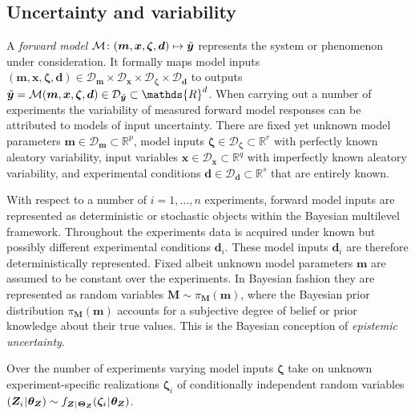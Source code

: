 \subsection{Uncertainty and variability} \label{sec:JAIS:Multilevel:Uncertainty}
A \textit{forward model} \(\mathcal{M} \colon (\bm{m},\bm{x},\bm{\zeta},\bm{d}) \mapsto \tilde{\bm{y}}\) represents the system or phenomenon under consideration.
It formally maps model inputs \((\bm{m},\bm{x},\bm{\zeta},\bm{d}) \in \mathcal{D}_{\bm{m}} \times \mathcal{D}_{\bm{x}} \times \mathcal{D}_{\bm{\zeta}} \times \mathcal{D}_{\bm{d}}\)
to outputs \(\perfect{\bm{y}}=\mathcal{M}(\bm{m},\bm{x},\bm{\zeta},\bm{d}) \in \mathcal{D}_{\perfect{\bm{y}}} \subset \mathds{R}^d\).
When carrying out a number of experiments the variability of measured forward model responses can be attributed to models of input uncertainty.
There are fixed yet unknown model parameters \(\bm{m} \in \mathcal{D}_{\bm{m}} \subset \mathds{R}^p\),
model inputs \(\bm{\zeta} \in \mathcal{D}_{\bm{\zeta}} \subset \mathds{R}^r\) with perfectly known aleatory variability,
input variables \(\bm{x} \in \mathcal{D}_{\bm{x}} \subset \mathds{R}^q\) with imperfectly known aleatory variability,
and experimental conditions \(\bm{d} \in \mathcal{D}_{\bm{d}} \subset \mathds{R}^s\) that are entirely known.
\par %
With respect to a number of \(i=1,\ldots,n\) experiments, forward model inputs are represented as deterministic or stochastic objects within the Bayesian multilevel framework.
Throughout the experiments data is acquired under known but possibly different experimental conditions \(\bm{d}_i\).
These model inputs \(\bm{d}_i\) are therefore deterministically represented.
Fixed albeit unknown model parameters \(\bm{m}\) are assumed to be constant over the experiments.
In Bayesian fashion they are represented as random variables \(\bm{M} \sim \pi_{\bm{M}} (\bm{m})\),
where the Bayesian prior distribution \(\pi_{\bm{M}} (\bm{m})\) accounts for a subjective degree of belief or prior knowledge about their true values.
This is the Bayesian conception of \textit{epistemic uncertainty}.
\par %
Over the number of experiments varying model inputs \(\bm{\zeta}\) take on unknown experiment-specific realizations \(\bm{\zeta}_i\) of conditionally independent
random variables \((\bm{Z}_i {\:\!}|{\:\!} \bm{\theta}_{\bm{Z}}) \sim f_{\bm{Z} {\:\!}|{\:\!} \bm{\Theta}_{\bm{Z}}}(\bm{\zeta}_i {\:\!}|{\:\!} \bm{\theta}_{\bm{Z}})\).
